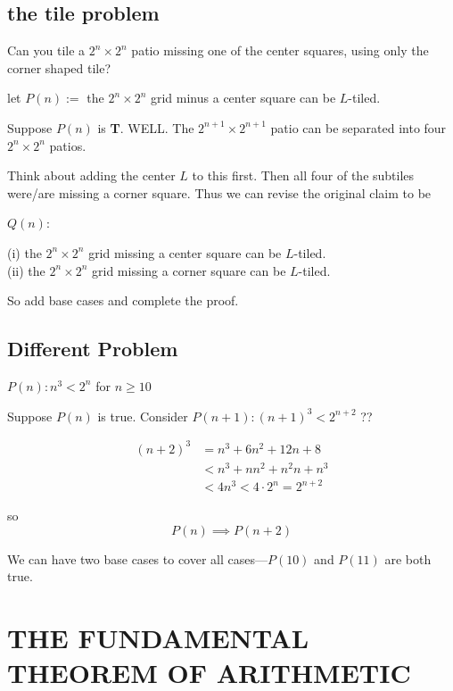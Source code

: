 \documentclass{article}
\begin{document}
\bigskip

\subsection*{the tile problem}

Can you tile a $2^n \times 2^n$ patio missing one of the center squares, using only the corner shaped tile?

let $P(n) := $ the $2^n \times 2^n$ grid minus a center square can be $L$-tiled.

Suppose $P(n)$ is \textbf{T}. WELL. The $2^{n+1} \times 2^{n+1}$ patio can be separated into four $2^n \times 2^n$ patios.

Think about adding the center $L$ to this first. Then all four of the subtiles were/are missing a corner square. Thus we can revise the original claim to be

$Q(n) :$

\begin{centering}
  (i) the $2^n \times 2^n$ grid missing a center square can be $L$-tiled. \\
  (ii) the $2^n \times 2^n$ grid missing a corner square can be $L$-tiled.
\end{centering}

So add base cases and complete the proof.





\bigskip

\noindent \subsection*{Different Problem} $P(n) : n^3 < 2^n$ for $n \geq 10$

Suppose $P(n)$ is true. Consider $P(n+1) : (n+1)^3 < 2^{n+2}$ ??

\begin{align*}
  (n+2)^3 &= n^3 + 6n^2 + 12n +8 \\
  &< n^3 + n n^2 + n^2 n + n^3 \\
  &< 4n^3 < 4 \cdot 2^n = 2^{n+2}
\end{align*}

so $$P(n) \implies P(n+2)$$

We can have two base cases to cover all cases---$P(10)$ and $P(11)$ are both true.

\section*{THE FUNDAMENTAL THEOREM OF ARITHMETIC}
\end{document}
